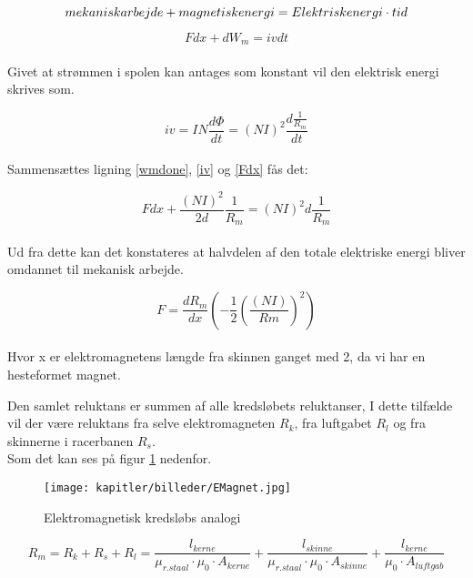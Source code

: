\begin{equation}
\begin{centering}
mekanisk arbejde + magnetisk energi =Elektrisk energi \cdot tid
\end{centering}
\end{equation}

\begin{equation}
F dx + dW_m = iv dt
\label{Fdx}
\end{equation}
\\
Givet at strømmen i spolen kan antages som konstant vil den elektrisk energi skrives som.

\begin{equation}
iv=IN \frac{d\Phi}{dt} =(NI)^2  \frac{d\frac{1}{R_m}}{dt}
\label{iv}
\end{equation}
\\
Sammensættes ligning \ref{wmdone}, \ref{iv} og \ref{Fdx} fås det:

\begin{equation}
F dx+\frac{(NI)^2}{2d} \frac{1}{R_m} =(NI)^2  d \frac{1}{R_m}
\end{equation}
\\
Ud fra dette kan det konstateres at halvdelen af den totale elektriske energi bliver omdannet til mekanisk arbejde.

\begin{equation}
F = \frac{dR_m}{dx} (-\frac{1}{2} (\frac{(NI)}{Rm} )^2 )
\end{equation}
\\
Hvor x er elektromagnetens længde fra skinnen ganget med 2, da vi har en hesteformet magnet.

Den samlet reluktans er summen af alle kredsløbets reluktanser, I dette tilfælde vil der være reluktans fra selve elektromagneten $R_k$, fra luftgabet $R_l$ og fra skinnerne i racerbanen $R_s$.
\\
Som det kan ses på figur \ref{fig:Mkreds} nedenfor.

\begin{figure}[ht]
	\centering
	\texttt{[image: kapitler/billeder/EMagnet.jpg]}
	\caption{Elektromagnetisk kredsløbs analogi}
		\label{fig:Mkreds}
	\end{figure}


\begin{equation}
\label{rm1}
R_m =R_k + R_s + R_l = \frac{l_{kerne}}{\mu_{r.staal} \cdot \mu_0 \cdot A_{kerne} } + \frac {l_{skinne}}{\mu_{r.staal} \cdot \mu_0 \cdot A_{skinne} }  + \frac {l_{kerne}}{\mu_0 \cdot A_{luftgab} }
\end{equation}

